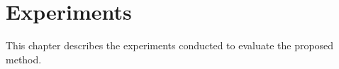 \chapter{Experiments}
\label{chapter:experiments}

\begin{ChapAbstract}
    This chapter describes the experiments conducted to evaluate the proposed method.
\end{ChapAbstract}





